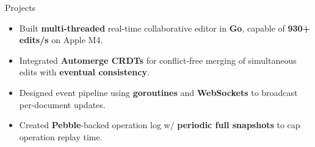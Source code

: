 \documentclass{resume} %
\begin{document}
\begin{workSection}{Projects}
	\customItem[
	title=\href{https://github.com/ashkanArabim/ashdocs}{Ashdocs \faExternalLink},
	technologies= | Go(Golang){,} Websocket{,} Automerge,
	]
	\begin{itemize}
		\vspace{-0.5em}
		\itemsep -6pt {}
		\item Built \textbf{multi-threaded} real-time collaborative editor in \textbf{Go}, capable of \textbf{930+ edits/s} on Apple M4.
		\item Integrated \textbf{Automerge CRDTs} for conflict-free merging of simultaneous edits with \textbf{eventual consistency}.
		\item Designed event pipeline using \textbf{goroutines} and \textbf{WebSockets} to broadcast per-document updates.
		\item Created \textbf{Pebble}-backed operation log w/ \textbf{periodic full snapshots} to cap operation replay time.
	\end{itemize}
	

\end{workSection}
\end{document}
